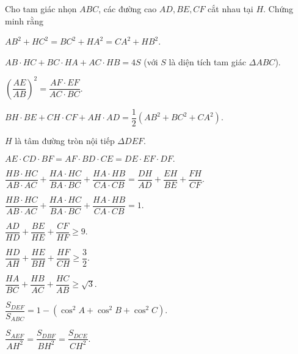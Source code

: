 \noindent
\begin{bt}%
Cho tam giác nhọn $ ABC $, các đường cao $ AD, BE, CF $ cắt nhau tại $ H $. Chứng minh rằng
\begin{listEX}
\item $ AB^2+HC^2=BC^2+HA^2 =CA^2 +HB^2 $.
\item $ AB\cdot HC +BC\cdot HA +AC\cdot HB =4S $ (với $ S  $ là diện tích tam giác $ \Delta ABC $). 
\item $ \left( \dfrac{AE}{AB}\right)^2 =\dfrac{AF\cdot EF}{AC\cdot BC}. $
\item $ BH\cdot BE +CH\cdot CF +AH\cdot AD =\dfrac{1}{2} \left( AB^2 +BC^2+CA^2\right)  $.
\item $ H $ là tâm đường tròn nội tiếp  $ \Delta DEF $.
\item $ AE\cdot CD \cdot BF =AF\cdot BD\cdot CE =DE \cdot EF \cdot DF.  $
\item $\dfrac{HB\cdot HC}{AB\cdot AC}+\dfrac{HA\cdot HC}{BA\cdot BC}+\dfrac{HA\cdot HB}{CA\cdot CB} =\dfrac{DH}{AD}+\dfrac{EH}{BE}+\dfrac{FH}{CF} $.
\item $ \dfrac{HB\cdot HC}{AB\cdot AC}+\dfrac{HA\cdot HC}{BA\cdot BC}+\dfrac{HA\cdot HB}{CA\cdot CB}=1. $
\item $ \dfrac{AD}{HD}+\dfrac{BE}{HE}+\dfrac{CF}{HF} \ge 9. $
\item $ \dfrac{HD}{AH}+\dfrac{HE}{BH}+\dfrac{HF}{CH} \ge \dfrac{3}{2}. $
\item $ \dfrac{HA}{BC}+\dfrac{HB}{AC}+\dfrac{HC}{AB}\ge \sqrt{3}. $
\item $\dfrac{S_{DEF}}{S_{ABC}} =1-\left( \cos^2 A+ \cos^2B +\cos^2C \right)$.
\item $ \dfrac{S_{AEF}}{AH^2} =\dfrac{S_{DBF}}{BH^2}=\dfrac{S_{DCE}}{CH^2}. $
\end{listEX}
\end{bt}
